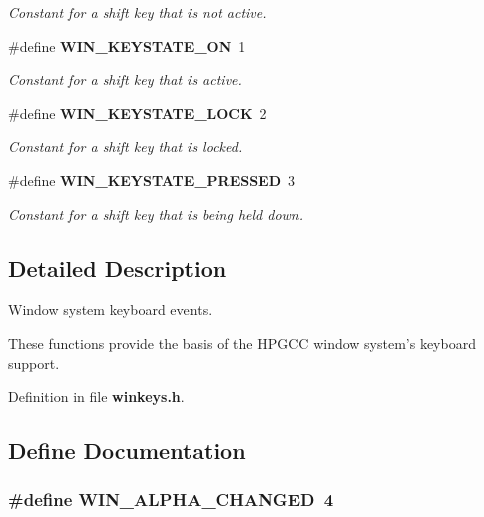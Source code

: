 \begin{CompactItemize}
\begin{CompactList}\small\item\em Constant for a shift key that is not active. \item\end{CompactList}\item 
\#define {\bf WIN\_\-KEYSTATE\_\-ON}~1
\begin{CompactList}\small\item\em Constant for a shift key that is active. \item\end{CompactList}\item 
\#define {\bf WIN\_\-KEYSTATE\_\-LOCK}~2\label{winkeys_8h_a8}

\begin{CompactList}\small\item\em Constant for a shift key that is locked. \item\end{CompactList}\item 
\#define {\bf WIN\_\-KEYSTATE\_\-PRESSED}~3\label{winkeys_8h_a9}

\begin{CompactList}\small\item\em Constant for a shift key that is being held down. \item\end{CompactList}\end{CompactItemize}


\subsection{Detailed Description}
Window system keyboard events. 

These functions provide the basis of the HPGCC window system's keyboard support. 

Definition in file {\bf winkeys.h}.

\subsection{Define Documentation}
\subsubsection{\setlength{\rightskip}{0pt plus 5cm}\#define WIN\_\-ALPHA\_\-CHANGED~4}\label{winkeys_8h_a3}



